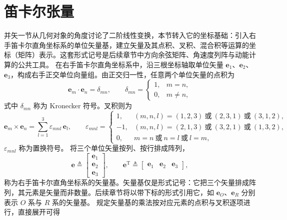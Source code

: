 \section{笛卡尔张量}
并矢一节从几何对象的角度讨论了二阶线性变换，本节转入它的坐标基础：引入右手笛卡尔直角坐标系的单位矢量基，建立矢量及其点积、叉积、混合积等运算的坐标（矩阵）表示。这套形式记号是后续章节中方向余弦矩阵、角速度列阵与动能计算的公共工具。
在右手笛卡尔直角坐标系中，沿三根坐标轴取单位矢量 $\mathbf{e}_1$、$\mathbf{e}_2$、$\mathbf{e}_3$，构成右手正交单位向量组。由正交归一性，任意两个单位矢量的点积为
\[
\mathbf{e}_m \cdot \mathbf{e}_n = \delta_{mn}, \qquad
\delta_{mn} =
\begin{cases}
1, & m = n, \\
0, & m \neq n,
\end{cases}
\]
式中 $\delta_{mn}$ 称为 Kronecker 符号。叉积则为
\[
\mathbf{e}_m \times \mathbf{e}_n = \sum_{l=1}^{3} \varepsilon_{mnl}\,\mathbf{e}_l, \qquad
\varepsilon_{mnl} =
\begin{cases}
1, & (m,n,l)=(1,2,3)\ \text{或}\ (2,3,1)\ \text{或}\ (3,1,2), \\
-1, & (m,n,l)=(2,1,3)\ \text{或}\ (3,2,1)\ \text{或}\ (1,3,2), \\
0, & m=n\ \text{或}\ n=l\ \text{或}\ l=m,
\end{cases}
\]
$\varepsilon_{mnl}$ 称为置换符号。
将三个单位矢量按列、按行排成阵列，
\[
\boldsymbol{e} \triangleq
\begin{bmatrix} \mathbf{e}_1 \\ \mathbf{e}_2 \\ \mathbf{e}_3 \end{bmatrix}, \qquad
\boldsymbol{e}^{\mathrm{T}} \triangleq
\begin{bmatrix} \mathbf{e}_1 & \mathbf{e}_2 & \mathbf{e}_3 \end{bmatrix},
\]
称为右手笛卡尔直角坐标系的矢量基。矢量基仅是形式记号：它把三个矢量排成阵列，其元素是矢量而非数量。后续章节将以带下标的形式引用它，如 $\boldsymbol{e}_O$、$\boldsymbol{e}_R$ 分别表示 $O$ 系与 $R$ 系的矢量基。
规定矢量基的乘法按对应元素的点积与叉积逐项进行，直接展开可得

